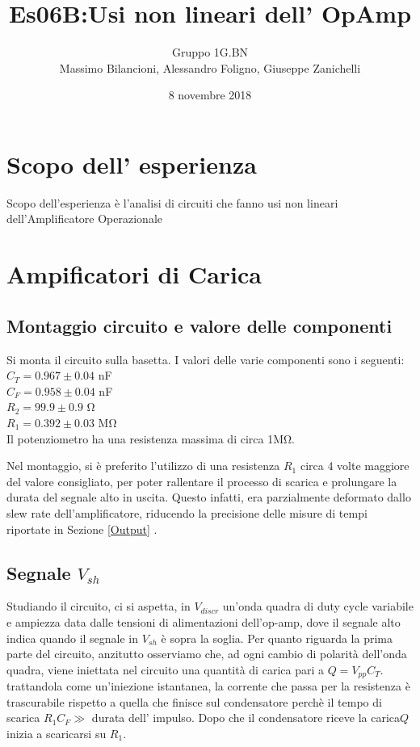 \documentclass[10pt,a4paper]{article}
\author{Gruppo 1G.BN \\ Massimo Bilancioni, Alessandro Foligno, Giuseppe Zanichelli }
\title{Es06B:Usi non lineari dell’ OpAmp }
\begin{document}
	\date{8 novembre 2018}
	\maketitle
	
	
	\section*{Scopo dell' esperienza}
	Scopo dell'esperienza è l'analisi di circuiti che fanno usi non lineari dell'Amplificatore Operazionale




\section{Ampificatori di Carica}
	\subsection{Montaggio circuito e valore delle componenti}
		Si monta il circuito sulla basetta.
		I valori delle varie componenti sono i seguenti:
		\\$C_T=0.967\pm 0.04$ \si{\nano\farad}\\$C_F=0.958\pm 0.04$ \si{\nano\farad}\\$R_2=99.9\pm 0.9 $ \si{\ohm}\\$R_1=0.392 \pm0.03   $ \si{\mega \ohm}\\
				
Il potenziometro ha una resistenza massima di circa 1\si{\mega\ohm}.


		
Nel montaggio, si è preferito l'utilizzo di una resistenza $R_1$ circa 4 volte maggiore del valore consigliato, per poter rallentare il processo di scarica e prolungare la durata del segnale alto in uscita.
		Questo infatti, era parzialmente deformato dallo slew rate dell'amplificatore, riducendo la precisione delle misure di tempi riportate in Sezione \ref{Output} .
	\subsection{Segnale $V_{sh}$}
		Studiando il circuito, ci si aspetta, in $V_{discr}$ un'onda quadra di duty cycle variabile e ampiezza data dalle tensioni di alimentazioni dell'op-amp, dove il segnale alto indica quando il segnale in $V_{sh}$ è sopra la soglia.
		Per quanto riguarda la prima parte del circuito, anzitutto osserviamo che, ad ogni cambio di polarità dell'onda quadra, viene iniettata nel circuito una quantità di carica pari a $Q=V_{pp} C_T$. trattandola come un'iniezione istantanea, la  corrente che passa per la resistenza è trascurabile rispetto a quella che finisce sul condensatore perchè il tempo di scarica $R_1 C_F \gg$ durata dell' impulso.
		Dopo che il condensatore riceve la carica$Q$ inizia a scaricarsi su $R_1$. 
\end{document}
